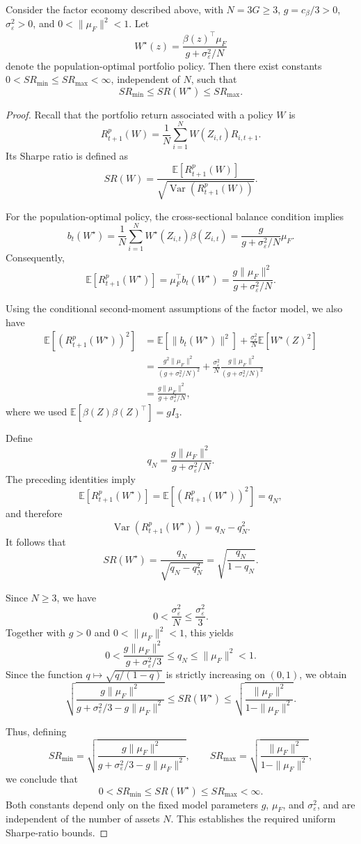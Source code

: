 \begin{proposition}
Consider the factor economy described above, with $N=3G\geq3$, $g=c_\beta/3>0$, $\sigma_\varepsilon^2>0$, and $0<\|\mu_F\|^2<1$. Let
\[
W^\star(z)=\frac{\beta(z)^\top\mu_F}{g+\sigma_\varepsilon^2/N}
\]
denote the population-optimal portfolio policy. Then there exist constants $0<SR_{\min}\leq SR_{\max}<\infty$, independent of $N$, such that
\[
SR_{\min}\leq SR(W^\star)\leq SR_{\max}.
\]
\end{proposition}

\begin{proof}
Recall that the portfolio return associated with a policy $W$ is
\[
R^p_{t+1}(W)=\frac1N\sum_{i=1}^N W(Z_{i,t})R_{i,t+1}.
\]
Its Sharpe ratio is defined as
\[
SR(W)=\frac{\mathbb E[R^p_{t+1}(W)]}
{\sqrt{\operatorname{Var}(R^p_{t+1}(W))}}.
\]

For the population-optimal policy, the cross-sectional balance condition implies
\[
b_t(W^\star)=\frac1N\sum_{i=1}^N W^\star(Z_{i,t})\beta(Z_{i,t})
=\frac{g}{g+\sigma_\varepsilon^2/N}\mu_F.
\]
Consequently,
\[
\mathbb E[R^p_{t+1}(W^\star)]
=\mu_F^\top b_t(W^\star)
=\frac{g\|\mu_F\|^2}{g+\sigma_\varepsilon^2/N}.
\]

Using the conditional second-moment assumptions of the factor model, we also have
\[
\begin{aligned}
\mathbb E[(R^p_{t+1}(W^\star))^2]
&=\mathbb E[\|b_t(W^\star)\|^2]
+\frac{\sigma_\varepsilon^2}{N}\mathbb E[W^\star(Z)^2]\\
&=\frac{g^2\|\mu_F\|^2}{(g+\sigma_\varepsilon^2/N)^2}
+\frac{\sigma_\varepsilon^2}{N}
\frac{g\|\mu_F\|^2}{(g+\sigma_\varepsilon^2/N)^2}\\
&=\frac{g\|\mu_F\|^2}{g+\sigma_\varepsilon^2/N},
\end{aligned}
\]
where we used $\mathbb E[\beta(Z)\beta(Z)^\top]=gI_3$.

Define
\[
q_N=\frac{g\|\mu_F\|^2}{g+\sigma_\varepsilon^2/N}.
\]
The preceding identities imply
\[
\mathbb E[R^p_{t+1}(W^\star)]
=\mathbb E[(R^p_{t+1}(W^\star))^2]=q_N,
\]
and therefore
\[
\operatorname{Var}(R^p_{t+1}(W^\star))=q_N-q_N^2.
\]
It follows that
\[
SR(W^\star)=\frac{q_N}{\sqrt{q_N-q_N^2}}
=\sqrt{\frac{q_N}{1-q_N}}.
\]

Since $N\geq3$, we have
\[
0<\frac{\sigma_\varepsilon^2}{N}\leq\frac{\sigma_\varepsilon^2}{3}.
\]
Together with $g>0$ and $0<\|\mu_F\|^2<1$, this yields
\[
0<
\frac{g\|\mu_F\|^2}{g+\sigma_\varepsilon^2/3}
\leq q_N
\leq\|\mu_F\|^2<1.
\]
Since the function $q\mapsto\sqrt{q/(1-q)}$ is strictly increasing on $(0,1)$, we obtain
\[
\sqrt{\frac{g\|\mu_F\|^2}
{g+\sigma_\varepsilon^2/3-g\|\mu_F\|^2}}
\leq SR(W^\star)
\leq
\sqrt{\frac{\|\mu_F\|^2}{1-\|\mu_F\|^2}}.
\]

Thus, defining
\[
SR_{\min}=
\sqrt{\frac{g\|\mu_F\|^2}
{g+\sigma_\varepsilon^2/3-g\|\mu_F\|^2}},
\qquad
SR_{\max}=
\sqrt{\frac{\|\mu_F\|^2}{1-\|\mu_F\|^2}},
\]
we conclude that
\[
0<SR_{\min}\leq SR(W^\star)\leq SR_{\max}<\infty.
\]
Both constants depend only on the fixed model parameters $g$, $\mu_F$, and $\sigma_\varepsilon^2$, and are independent of the number of assets $N$. This establishes the required uniform Sharpe-ratio bounds.
\end{proof}
